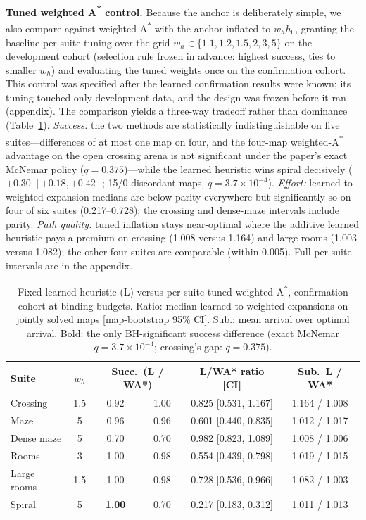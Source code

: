 \documentclass[letterpaper]{article} %
\begin{document}
\textbf{Tuned weighted A\textsuperscript{*} control.} Because the anchor is deliberately simple, we also compare against weighted A\textsuperscript{*} with the anchor inflated to $w_h h_0$, granting the baseline per-suite tuning over the grid $w_h \in \{1.1, 1.2, 1.5, 2, 3, 5\}$ on the development cohort (selection rule frozen in advance: highest success, ties to smaller $w_h$) and evaluating the tuned weights once on the confirmation cohort. This control was specified after the learned confirmation results were known; its tuning touched only development data, and the design was frozen before it ran (appendix). The comparison yields a three-way tradeoff rather than dominance (Table~\ref{tab:wastar-main}). \emph{Success:} the two methods are statistically indistinguishable on five suites---differences of at most one map on four, and the four-map weighted-A\textsuperscript{*} advantage on the open crossing arena is not significant under the paper's exact McNemar policy ($q{=}0.375$)---while the learned heuristic wins spiral decisively ($+0.30$ $[+0.18,+0.42]$; 15/0 discordant maps, $q{=}3.7\times10^{-4}$). \emph{Effort:} learned-to-weighted expansion medians are below parity everywhere but significantly so on four of six suites (0.217--0.728); the crossing and dense-maze intervals include parity. \emph{Path quality:} tuned inflation stays near-optimal where the additive learned heuristic pays a premium on crossing (1.008 versus 1.164) and large rooms (1.003 versus 1.082); the other four suites are comparable (within 0.005). Full per-suite intervals are in the appendix.

\begin{table}[t]
\centering
\scriptsize
\setlength{\tabcolsep}{2.6pt}
\begin{tabular}{lccccc}
\toprule
Suite & $w_h$ & \multicolumn{2}{c}{Succ.\ (L / WA*)} & L/WA* ratio [CI] & Sub.\ L / WA* \\
\midrule
Crossing & 1.5 & 0.92 & 1.00 & 0.825 [0.531, 1.167] & 1.164 / 1.008 \\
Maze & 5 & 0.96 & 0.96 & 0.601 [0.440, 0.835] & 1.012 / 1.017 \\
Dense maze & 5 & 0.70 & 0.70 & 0.982 [0.823, 1.089] & 1.008 / 1.006 \\
Rooms & 3 & 1.00 & 0.98 & 0.554 [0.439, 0.798] & 1.019 / 1.015 \\
Large rooms & 1.5 & 1.00 & 0.98 & 0.728 [0.536, 0.966] & 1.082 / 1.003 \\
Spiral & 5 & \textbf{1.00} & 0.70 & 0.217 [0.183, 0.312] & 1.011 / 1.013 \\
\bottomrule
\end{tabular}
\caption{Fixed learned heuristic (L) versus per-suite tuned weighted A\textsuperscript{*}, confirmation cohort at binding budgets. Ratio: median learned-to-weighted expansions on jointly solved maps [map-bootstrap 95\% CI]. Sub.: mean arrival over optimal arrival. Bold: the only BH-significant success difference (exact McNemar $q{=}3.7\times10^{-4}$; crossing's gap: $q{=}0.375$).}
\label{tab:wastar-main}
\end{table}
\end{document}
